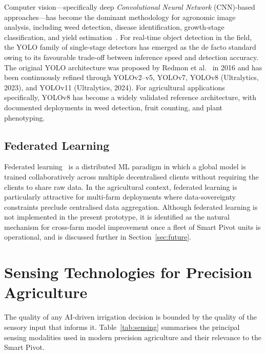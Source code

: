\documentclass[12pt,a4paper]{report}
\newcommand{\abbr}[2]{\emph{#1} (#2)}
\begin{document}
Computer vision---specifically deep \abbr{Convolutional Neural Network}{CNN}-based approaches---has become the dominant methodology for agronomic image analysis, including weed detection, disease identification, growth-stage classification, and yield estimation~\cite{Kamilaris2018}. For real-time object detection in the field, the YOLO family of single-stage detectors has emerged as the de facto standard owing to its favourable trade-off between inference speed and detection accuracy. The original YOLO architecture was proposed by Redmon et al.~\cite{Redmon2016} in 2016 and has been continuously refined through YOLOv2--v5, YOLOv7, YOLOv8 (Ultralytics, 2023), and YOLOv11 (Ultralytics, 2024). For agricultural applications specifically, YOLOv8 has become a widely validated reference architecture, with documented deployments in weed detection, fruit counting, and plant phenotyping.

\subsection{Federated Learning}

Federated learning~\cite{McMahan2017} is a distributed ML paradigm in which a global model is trained collaboratively across multiple decentralised clients without requiring the clients to share raw data. In the agricultural context, federated learning is particularly attractive for multi-farm deployments where data-sovereignty constraints preclude centralised data aggregation. Although federated learning is not implemented in the present prototype, it is identified as the natural mechanism for cross-farm model improvement once a fleet of Smart Pivot units is operational, and is discussed further in Section~\ref{sec:future}.

\section{Sensing Technologies for Precision Agriculture}

The quality of any AI-driven irrigation decision is bounded by the quality of the sensory input that informs it. Table~\ref{tab:sensing} summarises the principal sensing modalities used in modern precision agriculture and their relevance to the Smart Pivot.
\end{document}
